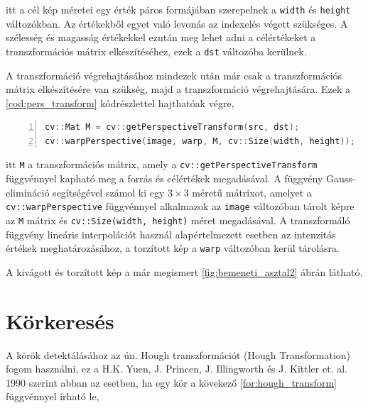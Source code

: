\par itt a cél kép méretei egy érték páros formájában szerepelnek a \lstinline{width} és \lstinline{height} változókban. Az értékekből egyet való levonás az indexelés végett szükséges. A szélesség és magasság értékekkel ezután meg lehet adni a célértékeket a transzformációs mátrix elkészítéséhez, ezek a \lstinline{dst} változóba kerülnek.
\par A transzformáció végrehajtásához mindezek után már csak a transzformációs mátrix elkészítésére van szükség, majd a transzformáció végrehajtására.
\newline Ezek a \ref{cod:pers_transform} kódrészlettel hajthatóak végre,

\vspace{2mm}
\hspace{-10mm}
\begin{minipage}{\linewidth}
\begin{lstlisting}[language=C++, numbers=left, caption={A transzformáció végrehajtása.}, label={cod:pers_transform}]
cv::Mat M = cv::getPerspectiveTransform(src, dst);
cv::warpPerspective(image, warp, M, cv::Size(width, height));
\end{lstlisting}
\end{minipage}

\par itt \lstinline{M} a transzformációs mátrix, amely a \lstinline{cv::getPerspectiveTransform} függvénnyel \cite{opencv_docs} kapható meg a forrás és célértékek megadásával. A függvény Gauss-elimináció \cite{grcar2011mathematicians} segítségével számol ki egy $3\times3$ méretű mátrixot, amelyet a \lstinline{cv::warpPerspective} függvénnyel \cite{opencv_docs} alkalmazok az \lstinline{image} változóban tárolt képre az \lstinline{M} mátrix és \lstinline{cv::Size(width, height)} méret megadásával. A transzformáló függvény lineáris interpolációt \cite{blu0401interpolation} használ alapértelmezett esetben az intenzitás értékek meghatározásához, a torzított kép a \lstinline{warp} változóban kerül tárolásra.
\par A kivágott és torzított kép a már megismert \ref{fig:bemeneti_asztal2} ábrán látható.

\section{Körkeresés}
A körök detektálásához az ún. Hough transzformációt (Hough Transformation) fogom használni, ez a H.K. Yuen, J. Princen, J. Illingworth és J. Kittler et. al. 1990 \cite{YUEN199071} szerint abban az esetben, ha egy kör a kövekező \ref{for:hough_transform} függvénnyel írható le,

